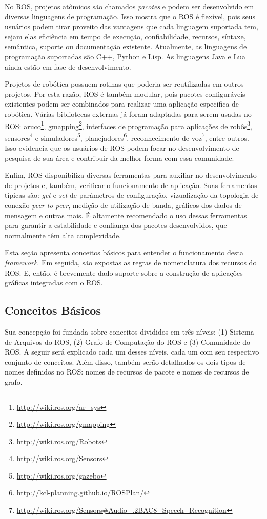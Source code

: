         No ROS, projetos atômicos são chamados \textit{pacotes} e podem ser desenvolvido em diversas linguagens de programação. Isso mostra que o ROS é flexível, pois seus usuários podem tirar proveito das vantagens que cada linguagem suportada tem, sejam elas eficiência em tempo de execução, confiabilidade, recursos, síntaxe, semântica, suporte ou documentação existente. Atualmente, as linguagens de programação suportadas são C++, Python e Lisp. As linguagens Java e Lua ainda estão em fase de desenvolvimento.
        
        Projetos de robótica possuem rotinas que poderia ser reutilizadas em outros projetos. Por esta razão, ROS é também modular, pois pacotes configuráveis existentes podem ser combinados para realizar uma aplicação especifica de robótica. Várias bibliotecas externas já foram adaptadas para serem usadas no ROS: aruco\footnote{\url{http://wiki.ros.org/ar_sys}}, gmapping\footnote{\url{http://wiki.ros.org/gmapping}}, interfaces de programação para aplicações de robôs\footnote{\url{http://wiki.ros.org/Robots}}, sensores\footnote{\url{http://wiki.ros.org/Sensors}} e simuladores\footnote{\url{http://wiki.ros.org/gazebo}}, planejadores\footnote{\url{http://kcl-planning.github.io/ROSPlan/}}, reconhecimento de voz\footnote{\url{http://wiki.ros.org/Sensors\#Audio_.2BAC8_Speech_Recognition}}, entre outros. Isso evidencia que os usuários de ROS podem focar no desenvolvimento de pesquisa de sua área e contribuir da melhor forma com essa comunidade.
        
        Enfim, ROS disponibiliza diversas ferramentas para auxiliar no desenvolvimento de projetos e, também, verificar o funcionamento de aplicação. Suas ferramentas típicas são: \textit{get} e \textit{set} de parâmetros de configuração, vizualização da topologia de conexão \textit{peer-to-peer}, medição de utilização de banda, gráficos dos dados de mensagem e outras mais. É altamente recomendado o uso dessas ferramentas para garantir a estabilidade e confiança dos pacotes desenvolvidos, que normalmente têm alta complexidade.
        
        Esta seção apresenta conceitos básicos para entender o funcionamento desta \textit{framework}. Em seguida, são expostas as regras de nomenclatura dos recursos do ROS. E, então, é brevemente dado suporte sobre a construção de aplicações gráficas integradas com o ROS.
        
        \subsection{Conceitos Básicos} \label{subsec:ros_conceitos}
            Sua concepção foi fundada sobre conceitos divididos em três níveis: (1) Sistema de Arquivos do ROS, (2) Grafo de Computação do ROS e (3) Comunidade do ROS. A seguir será explicado cada um desses níveis, cada um com seu respectivo conjunto de conceitos. Além disso, também serão detalhados os dois tipos de nomes definidos no ROS: nomes de recursos de pacote e nomes de recursos de grafo.
            
